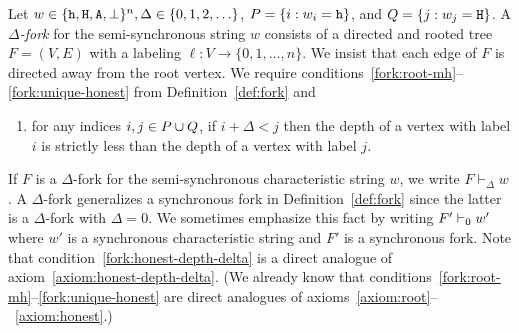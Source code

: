   \begin{definition}\label{def:delta-fork}
    Let $w\in \{\mathtt{h}, \mathtt{H}, \mathtt{A}, \perp\}^n, \Delta \in \{0, 1, 2, \ldots \}$, 
    $P = \{ i : w_i = \mathtt{h}\}$, and $Q = \{ j : w_j = \mathtt{H}\}$. 
    A \emph{$\Delta$-fork} for the semi-synchronous string $w$ consists of a directed and rooted
    tree $F=(V,E)$ with a labeling $\ell:V \to \{0,1,\ldots,n\}$. We insist
    that each edge of $F$ is directed away from the root vertex. 
    We require conditions~\ref{fork:root-mh}--\ref{fork:unique-honest} 
    from Definition~\ref{def:fork} and 
    \begin{enumerate}[label=(F{\arabic*}\textsubscript{$\Delta$}), start=4]



      \item\label{fork:honest-depth-delta} 
      for any indices $i,j\in P \cup Q$, 
      if $i + \Delta < j$ then 
      the depth of a vertex with label $i$ 
      is strictly less than 
      the depth of a vertex with label $j$.
    \end{enumerate}
  \end{definition}
  If $F$ is a $\Delta$-fork for the semi-synchronous characteristic string $w$, we write
  $F\vdash_\Delta w$.  
  A $\Delta$-fork generalizes a synchronous fork in Definition~\ref{def:fork} 
  since the latter is a $\Delta$-fork with $\Delta = 0$. 
  We sometimes emphasize this fact by writing $F' \vdash_0 w'$ 
  where $w'$ is a synchronous characteristic string and $F'$ is a synchronous fork.
  Note that 
  condition~\ref{fork:honest-depth-delta} 
  is a direct analogue of axiom~\ref{axiom:honest-depth-delta}.
  (We already know that conditions~\ref{fork:root-mh}--\ref{fork:unique-honest} 
  are direct
  analogues of axioms~\ref{axiom:root}--~\ref{axiom:honest}.) 


